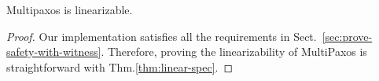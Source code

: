 \begin{theorem}
Multipaxos is  linearizable.
\end{theorem}

\begin{proof}
Our implementation satisfies all the requirements in Sect.~\ref{sec:prove-safety-with-witness}. 
Therefore, proving the linearizability of MultiPaxos is straightforward with Thm.\ref{thm:linear-spec}.
\end{proof}
